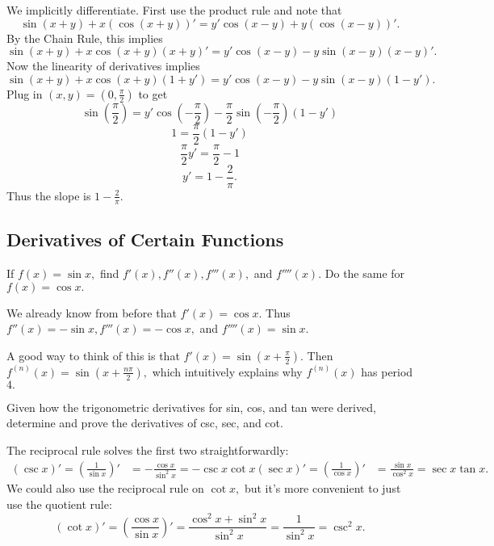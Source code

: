 \documentclass[blue,onecol]{shooting}
\begin{document}
\begin{sol}
We implicitly differentiate. First use the product rule and note that
\[\sin(x+y)+x(\cos(x+y))'=y'\cos(x-y)+y(\cos(x-y))'.\]
By the Chain Rule, this implies
\[\sin(x+y)+x\cos(x+y)(x+y)'=y'\cos(x-y)-y\sin(x-y)(x-y)'.\]
Now the linearity of derivatives implies
\[\sin(x+y)+x\cos(x+y)(1+y')=y'\cos(x-y)-y\sin(x-y)(1-y').\]
Plug in $(x,y)=(0,\frac{\pi}{2})$ to get
\[\sin(\frac{\pi}{2})=y'\cos(-\frac{\pi}{2})-\frac{\pi}{2}\sin(-\frac{\pi}{2})(1-y')\]
\[1=\frac{\pi}{2}(1-y')\]
\[\frac{\pi}{2}y'=\frac{\pi}{2}-1\]
\[y'=1-\frac{2}{\pi}.\]
Thus the slope is $1-\frac{2}{\pi}.$
\end{sol}

\subsection{Derivatives of Certain Functions}

\begin{exer}
If $f(x)=\sin x,$ find $f'(x),f''(x),f'''(x),$ and $f''''(x).$ Do the same for $f(x)=\cos x.$
\end{exer}

\begin{sol}
We already know from before that $f'(x)=\cos x.$ Thus $f''(x)=-\sin x,f'''(x)=-\cos x,$ and $f''''(x)=\sin x.$

A good way to think of this is that $f'(x)=\sin(x+\frac{\pi}{2}).$ Then $f^{(n)}(x)=\sin(x+\frac{n\pi}{2}),$ which intuitively explains why $f^{(n)}(x)$ has period $4.$
\end{sol}

\begin{exer}
Given how the trigonometric derivatives for sin, cos, and tan were derived, determine and prove the derivatives of csc, sec, and cot.
\end{exer}

\begin{sol}
The reciprocal rule solves the first two straightforwardly:
\begin{align*}
(\csc x)'=\left(\frac{1}{\sin x}\right)'&=-\frac{\cos x}{\sin^2x}=-\csc x\cot x 
(\sec x)'=\left(\frac{1}{\cos x}\right)'&=\frac{\sin x}{\cos^2x}=\sec x\tan x.
\end{align*}
We could also use the reciprocal rule on $\cot x,$ but it's more convenient to just use the quotient rule:
\[(\cot x)'=\left(\frac{\cos x}{\sin x}\right)'=\frac{\cos^2x+\sin^2x}{\sin^2x}=\frac{1}{\sin^2x}=\csc^2x.\]
\end{sol}
\end{document}

